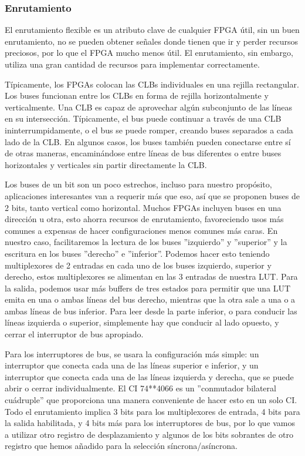 \documentclass[12pt]{article}
\begin{document}
\subsubsection{Enrutamiento}

El enrutamiento flexible es un atributo clave de cualquier FPGA útil, sin un buen enrutamiento, no se pueden obtener señales donde tienen que ir y perder recursos preciosos, por lo que el FPGA mucho menos útil. El enrutamiento, sin embargo, utiliza una gran cantidad de recursos para implementar correctamente. 
 
Típicamente, los FPGAs colocan las CLBs individuales en una rejilla rectangular. Los buses funcionan entre los CLBs en forma de rejilla horizontalmente y verticalmente. Una CLB es capaz de aprovechar algún subconjunto de las líneas en su intersección. Típicamente, el bus puede continuar a través de una CLB ininterrumpidamente, o el bus se puede romper, creando buses separados a cada lado de la CLB. En algunos casos, los buses también pueden conectarse entre sí de otras maneras, encaminándose entre líneas de bus diferentes o entre buses horizontales y verticales sin partir directamente la CLB. 
 
Los buses de un bit son un poco estrechos, incluso para nuestro propósito, aplicaciones interesantes van a requerir más que eso, así que se proponen buses de 2 bits, tanto vertical como horizontal. Muchos FPGAs incluyen buses en una dirección u otra, esto ahorra recursos de enrutamiento, favoreciendo usos más comunes a expensas de hacer configuraciones menos comunes más caras. En nuestro caso, facilitaremos la lectura de los buses ''izquierdo'' y ''superior'' y la escritura en los buses ''derecho'' e ''inferior''. Podemos hacer esto teniendo multiplexores de 2 entradas en cada uno de los buses izquierdo, superior y derecho, estos multiplexores se alimentan en las 3 entradas de nuestra LUT. Para la salida, podemos usar más buffers de tres estados para permitir que una LUT emita en una o ambas líneas del bus derecho, mientras que la otra sale a una o a ambas líneas de bus inferior. Para leer desde la parte inferior, o para conducir las líneas izquierda o superior, simplemente hay que conducir al lado opuesto, y cerrar el interruptor de bus apropiado. 
 
Para los interruptores de bus, se usara la configuración más simple: un interruptor que conecta cada una de las líneas superior e inferior, y un interruptor que conecta cada una de las líneas izquierda y derecha, que se puede abrir o cerrar individualmente. El CI 74**4066 es un ''conmutador bilateral cuádruple'' que proporciona una manera conveniente de hacer esto en un solo CI. Todo el enrutamiento implica 3 bits para los multiplexores de entrada, 4 bits para la salida habilitada, y 4 bits más para los interruptores de bus, por lo que vamos a utilizar otro registro de desplazamiento y algunos de los bits sobrantes de otro registro que hemos añadido para la selección síncrona/asíncrona.
\end{document}
